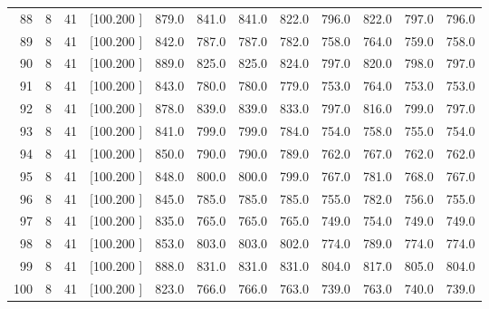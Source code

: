 \documentclass[12pt,a4paper]{article}
\begin{document}
\begin{center}
{\begin{tabular}{r r r r r r r r r r r r}
  88&  8& 41&[100.200   ]&   879.0&   841.0&   841.0&   822.0&   796.0&   822.0&   797.0&   796.0\\[-0.02in]
  89&  8& 41&[100.200   ]&   842.0&   787.0&   787.0&   782.0&   758.0&   764.0&   759.0&   758.0\\[-0.02in]
  90&  8& 41&[100.200   ]&   889.0&   825.0&   825.0&   824.0&   797.0&   820.0&   798.0&   797.0\\[-0.02in]
  91&  8& 41&[100.200   ]&   843.0&   780.0&   780.0&   779.0&   753.0&   764.0&   753.0&   753.0\\[-0.02in]
  92&  8& 41&[100.200   ]&   878.0&   839.0&   839.0&   833.0&   797.0&   816.0&   799.0&   797.0\\[-0.02in]
  93&  8& 41&[100.200   ]&   841.0&   799.0&   799.0&   784.0&   754.0&   758.0&   755.0&   754.0\\[-0.02in]
  94&  8& 41&[100.200   ]&   850.0&   790.0&   790.0&   789.0&   762.0&   767.0&   762.0&   762.0\\[-0.02in]
  95&  8& 41&[100.200   ]&   848.0&   800.0&   800.0&   799.0&   767.0&   781.0&   768.0&   767.0\\[-0.02in]
  96&  8& 41&[100.200   ]&   845.0&   785.0&   785.0&   785.0&   755.0&   782.0&   756.0&   755.0\\[-0.02in]
  97&  8& 41&[100.200   ]&   835.0&   765.0&   765.0&   765.0&   749.0&   754.0&   749.0&   749.0\\[-0.02in]
  98&  8& 41&[100.200   ]&   853.0&   803.0&   803.0&   802.0&   774.0&   789.0&   774.0&   774.0\\[-0.02in]
  99&  8& 41&[100.200   ]&   888.0&   831.0&   831.0&   831.0&   804.0&   817.0&   805.0&   804.0\\[-0.02in]
 100&  8& 41&[100.200   ]&   823.0&   766.0&   766.0&   763.0&   739.0&   763.0&   740.0&   739.0\\[-0.02in]

\hline
\end{tabular}}
\end{center}
\end{document}
